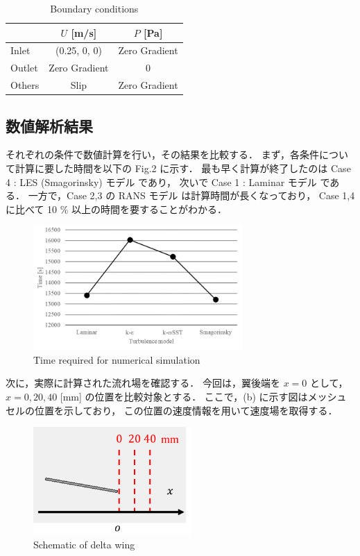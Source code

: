 \documentclass[twocolumn,a4j]{jsarticle}
\begin{document}
\begin{table}[hbtp]
	\centering
	\caption{Boundary conditions}
	\begin{tabular}{l c c}
		\hline
		       & $U$ [m/s]     & $P$ [Pa]      \\ \hline
		Inlet  & (0.25, 0, 0)  & Zero Gradient \\ \hline
		Outlet & Zero Gradient & 0             \\ \hline
		Others & Slip          & Zero Gradient \\ \hline
	\end{tabular}
\end{table}

\newpage
\subsection{数値解析結果}
それぞれの条件で数値計算を行い，その結果を比較する．
まず，各条件について計算に要した時間を以下の Fig.2 に示す．
最も早く計算が終了したのは Case 4 : LES (Smagorinsky) モデル であり，
次いで Case 1 : Laminar モデル である．
一方で，Case 2,3 の RANS モデル は計算時間が長くなっており，
Case 1,4 に比べて 10 \% 以上の時間を要することがわかる．
\begin{figure}[htbp]
	\centering
	\includegraphics[keepaspectratio, width=80mm]{../images/Simulation/Time_for_Numerical_Simulation.png}
	\caption{Time required for numerical simulation}
\end{figure}

次に，実際に計算された流れ場を確認する．
今回は，翼後端を $x=0$ として，$x=0, 20, 40$ [mm] の位置を比較対象とする．
ここで，(b) に示す図はメッシュセルの位置を示しており，
この位置の速度情報を用いて速度場を取得する．
\begin{figure}[htbp]
	\centering
	\includegraphics[keepaspectratio, width=60mm]{../images/Simulation/Schematic_Delta-Wing.png}
	\caption{Schematic of delta wing}
\end{figure}
\end{document}
